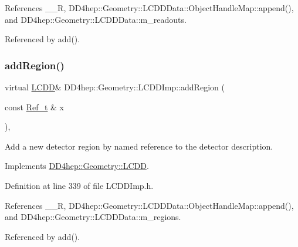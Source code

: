 References \+\_\+\+\_\+R, D\+D4hep\+::\+Geometry\+::\+L\+C\+D\+D\+Data\+::\+Object\+Handle\+Map\+::append(), and D\+D4hep\+::\+Geometry\+::\+L\+C\+D\+D\+Data\+::m\+\_\+readouts.



Referenced by add().

\hypertarget{class_d_d4hep_1_1_geometry_1_1_l_c_d_d_imp_a9b24c9ac8dde50f36fbeea3e6cb8d2cb}{}\label{class_d_d4hep_1_1_geometry_1_1_l_c_d_d_imp_a9b24c9ac8dde50f36fbeea3e6cb8d2cb} 
\subsubsection{\texorpdfstring{add\+Region()}{addRegion()}}
{\footnotesize\ttfamily virtual \hyperlink{class_d_d4hep_1_1_geometry_1_1_l_c_d_d}{L\+C\+DD}\& D\+D4hep\+::\+Geometry\+::\+L\+C\+D\+D\+Imp\+::add\+Region (\begin{DoxyParamCaption}\item[{const \hyperlink{group___d_d4_h_e_p___g_e_o_m_e_t_r_y_ga40af83be6718bb8828a3d83dc7f8c930}{Ref\+\_\+t} \&}]{x }\end{DoxyParamCaption})\hspace{0.3cm}{\ttfamily [inline]}, {\ttfamily [virtual]}}



Add a new detector region by named reference to the detector description. 



Implements \hyperlink{class_d_d4hep_1_1_geometry_1_1_l_c_d_d_a633c913dcf2a31b52976e5f5bd8a63e2}{D\+D4hep\+::\+Geometry\+::\+L\+C\+DD}.



Definition at line 339 of file L\+C\+D\+D\+Imp.\+h.



References \+\_\+\+\_\+R, D\+D4hep\+::\+Geometry\+::\+L\+C\+D\+D\+Data\+::\+Object\+Handle\+Map\+::append(), and D\+D4hep\+::\+Geometry\+::\+L\+C\+D\+D\+Data\+::m\+\_\+regions.



Referenced by add().

\hypertarget{class_d_d4hep_1_1_geometry_1_1_l_c_d_d_imp_a5509dc3840aa73a8c5d5e8f886f3be3f}{}\label{class_d_d4hep_1_1_geometry_1_1_l_c_d_d_imp_a5509dc3840aa73a8c5d5e8f886f3be3f} 

